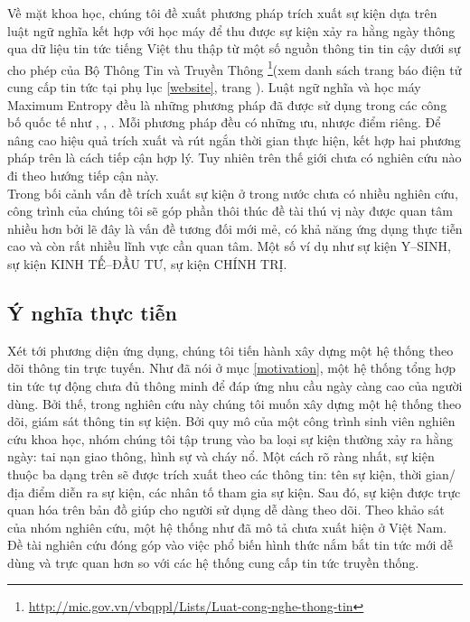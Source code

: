 \noindent Về mặt khoa học, chúng tôi đề xuất phương pháp trích xuất sự kiện dựa trên luật ngữ nghĩa kết hợp với học máy để thu được sự kiện xảy ra hằng ngày thông qua  dữ liệu tin tức tiếng Việt thu thập từ một số nguồn thông tin tin cậy dưới sự cho phép của Bộ Thông Tin và Truyền Thông \footnote{\href{http://mic.gov.vn/vbqppl/Lists/Vn$\%$20bn$\%$20QPPL/DispForm.aspx?ID=6988}{http://mic.gov.vn/vbqppl/Lists/Luat-cong-nghe-thong-tin}}(xem danh sách trang báo điện tử cung cấp tin tức tại  phụ lục \ref{website}, trang \pageref{website}). Luật ngữ nghĩa và học máy Maximum Entropy đều là những phương pháp đã được sử dụng trong các công bố quốc tế như \cite{CVJ09}, \cite{RDA05}, \cite{MD04}. Mỗi phương pháp đều có những ưu, nhược điểm riêng. Để nâng cao hiệu quả trích xuất và rút ngắn thời gian thực hiện, kết hợp hai phương pháp trên là cách tiếp cận hợp lý. Tuy nhiên trên thế giới chưa có nghiên cứu nào đi theo hướng tiếp cận này.
\\ \noindent Trong bối cảnh vấn đề trích xuất sự kiện ở trong nước chưa có nhiều nghiên cứu, công trình của chúng tôi sẽ góp phần thôi thúc đề tài thú vị này được quan tâm nhiều hơn bởi lẽ đây là vấn đề tương đối mới mẻ, có khả năng ứng dụng thực tiễn cao và còn rất nhiều lĩnh vực cần quan tâm. Một số ví dụ như sự kiện Y--SINH, sự kiện KINH TẾ--ĐẦU TƯ, sự kiện CHÍNH TRỊ.

\subsection{Ý nghĩa thực tiễn}
\noindent Xét tới  phương diện  ứng dụng, chúng tôi tiến hành xây dựng một hệ thống theo dõi thông tin trực tuyến. Như đã nói ở mục \ref{motivation}, một hệ thống tổng hợp tin tức tự động chưa đủ thông minh để đáp ứng nhu cầu ngày càng cao của người dùng. Bởi thế, trong nghiên cứu này chúng tôi muốn xây dựng một hệ thống theo dõi, giám sát thông tin sự kiện. Bởi quy mô của một công trình sinh viên nghiên cứu khoa học, nhóm chúng tôi tập trung vào ba loại sự kiện thường xảy ra hằng ngày: tai nạn giao thông, hình sự và cháy nổ. Một cách rõ ràng nhất, sự kiện thuộc ba dạng trên sẽ được trích xuất theo các thông tin: tên sự kiện, thời gian/địa điểm diễn ra sự kiện, các nhân tố tham gia sự kiện. Sau đó, sự kiện được trực quan hóa trên  bản đồ giúp cho người sử dụng dễ dàng theo dõi. Theo khảo sát của nhóm nghiên cứu, một hệ thống như đã mô tả chưa xuất hiện ở Việt Nam. Đề tài nghiên cứu đóng góp vào việc phổ biến hình thức nắm bắt tin tức mới dễ dùng và trực quan hơn so với các hệ thống cung cấp tin tức truyền thống.


